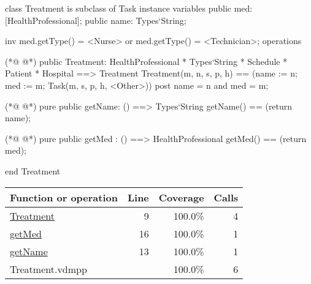 \begin{vdmpp}[breaklines=true]
class Treatment is subclass of Task
instance variables
  public med: [HealthProfessional];
  public name: Types`String;
  
  inv med.getType() = <Nurse> or med.getType() = <Technician>;
operations

(*@
\label{Treatment:9}
@*)
 public Treatment: HealthProfessional * Types`String * Schedule * Patient * Hospital ==> Treatment
  Treatment(m, n, s, p, h) == (name := n; med := m; Task(m, s, p, h, <Other>))
 post name = n and med = m;
 
(*@
\label{getName:13}
@*)
 pure public getName: () ==> Types`String
  getName() == (return name);
 
(*@
\label{getMed:16}
@*)
 pure public getMed : () ==> HealthProfessional
  getMed() == (return med);

end Treatment
\end{vdmpp}
\bigskip
\begin{longtable}{|l|r|r|r|}
\hline
Function or operation & Line & Coverage & Calls \\
\hline
\hline
\hyperref[Treatment:9]{Treatment} & 9&100.0\% & 4 \\
\hline
\hyperref[getMed:16]{getMed} & 16&100.0\% & 1 \\
\hline
\hyperref[getName:13]{getName} & 13&100.0\% & 1 \\
\hline
\hline
Treatment.vdmpp & & 100.0\% & 6 \\
\hline
\end{longtable}

